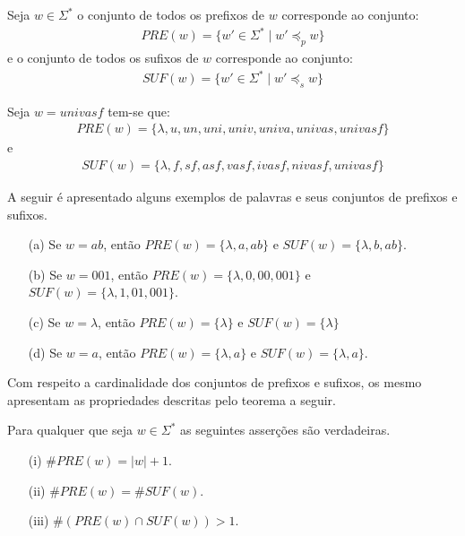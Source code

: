 \begin{definicao}\label{def:ConjuntoPrefixoSufixo}
	Seja $w \in \Sigma^*$ o conjunto de todos os prefixos de $w$ corresponde ao conjunto:
	\begin{eqnarray}
		PRE(w) = \{w' \in \Sigma^* \mid w' \preceq_p w\}
	\end{eqnarray}
	e o conjunto de todos os sufixos de $w$ corresponde ao conjunto:
	\begin{eqnarray}
		SUF(w) = \{w' \in \Sigma^* \mid w' \preceq_s w\}
	\end{eqnarray}
\end{definicao}

\begin{exemplo}
	Seja $w = univasf$ tem-se que:
	\begin{eqnarray*}
		PRE(w) = \{\lambda, u, un, uni, univ, univa, univas, univasf\}
	\end{eqnarray*}
	e
	\begin{eqnarray*}
		SUF(w) = \{\lambda, f, sf, asf, vasf, ivasf, nivasf, univasf \}
	\end{eqnarray*}
\end{exemplo}

\begin{exemplo}
	A seguir é apresentado alguns exemplos de palavras e seus conjuntos de prefixos e sufixos.
	\begin{itemize}
		\item[(a)] Se $w = ab$, então $PRE(w) = \{\lambda, a, ab\}$ e  $SUF(w) = \{\lambda, b, ab\}$.
		\item[(b)] Se $w = 001$, então $PRE(w) = \{\lambda, 0, 00, 001\}$ e  $SUF(w) = \{\lambda, 1, 01, 001\}$.
		\item[(c)] Se $w = \lambda$, então $PRE(w) = \{\lambda\}$ e  $SUF(w) = \{\lambda\}$
		\item[(d)] Se $w = a$, então $PRE(w) = \{\lambda, a\}$ e $SUF(w) = \{\lambda, a\}$.
	\end{itemize}
\end{exemplo}

Com respeito a cardinalidade dos conjuntos de prefixos e sufixos, os mesmo apresentam as propriedades descritas pelo teorema a seguir.

\begin{teorema}\label{teo:CardinalidadePrefixoSufixo}
	Para qualquer que seja $w \in \Sigma^*$ as seguintes asserções são verdadeiras.
	\begin{itemize}
		\item[(i)] $\# PRE(w) = |w| + 1$.
		\item[(ii)] $\#PRE(w) = \#SUF(w)$.
		\item[(iii)] $\#(PRE(w) \cap SUF(w)) > 1$.
	\end{itemize}
\end{teorema}

